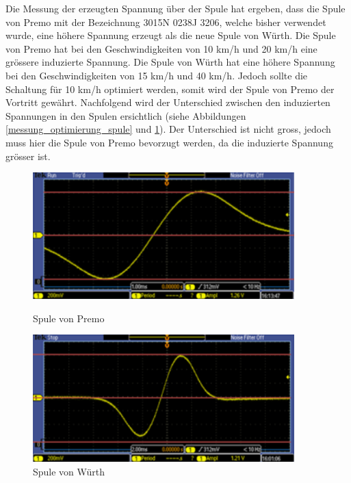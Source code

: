 Die Messung der erzeugten Spannung über der Spule hat ergeben, dass die Spule von Premo mit der Bezeichnung 3015N 0238J 3206, welche bisher verwendet wurde, eine höhere Spannung erzeugt als die neue Spule von Würth. Die Spule von Premo hat bei den Geschwindigkeiten von 10 km/h und 20 km/h eine grössere induzierte Spannung. Die Spule von Würth hat eine höhere Spannung bei den Geschwindigkeiten von 15 km/h und 40 km/h. Jedoch sollte die Schaltung für 10 km/h optimiert werden, somit wird der Spule von Premo der Vortritt gewährt. Nachfolgend wird der Unterschied zwischen den induzierten Spannungen in den Spulen ersichtlich (siehe Abbildungen \ref{messung_optimierung_spule} und \ref{blublu}). Der Unterschied ist nicht gross, jedoch muss hier die Spule von Premo bevorzugt werden, da die induzierte Spannung grösser ist.

\begin{figure}[ht]
 \begin{minipage}[t]{0.5\textwidth}
    \includegraphics[width=0.9\textwidth]{3Vorgehen/imag/Messung_Optimierung_Spule_links.png}
    \caption{Spule von Premo}               
    \label{messung_optimierung_spule} 
 \end{minipage}
 \begin{minipage}[t]{0.5\textwidth}
    \includegraphics[width=0.9\textwidth]{3Vorgehen/imag/Messung_Optimierung_Spule_rechts.png}
    \caption{Spule von Würth}  
    \label{blublu}             
 \end{minipage}
\end{figure}


